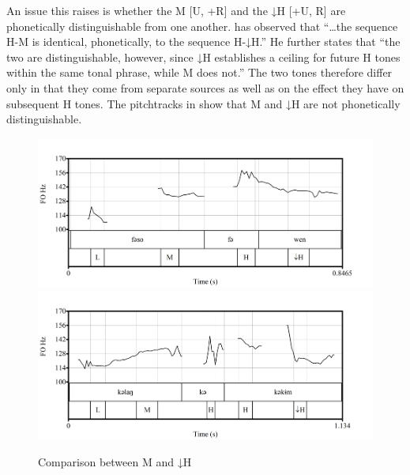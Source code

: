 \documentclass[output=paper,modfonts,nonflat,
 hidelinks
]{langsci/langscibook}
\begin{document}
An issue this raises is whether the M  [\textminus U, +R] and the ↓H  [+U, \textminus R] are phonetically distinguishable from one another. \citet[162]{Hyman1979babanki} has observed that “…the sequence H-M is identical, phonetically, to the sequence H-↓H.” He further states that “the two are distinguishable, however, since ↓H establishes a ceiling for future H tones within the same tonal phrase, while M does not.” The two tones therefore differ only in that they come from separate sources as well as on the effect they have on subsequent H tones. The pitchtracks in  show that M and ↓H are not phonetically distinguishable. 


\begin{figure}[p]
	{\includegraphics[width=.95\textwidth]{figures/fig-akumbu-2a}}\\
	{\includegraphics[width=.95\textwidth]{figures/fig-akumbu-2b}}
\caption{Comparison between M and ↓H}\label{fig:akumbu:2}
\end{figure}
 
\end{document}
